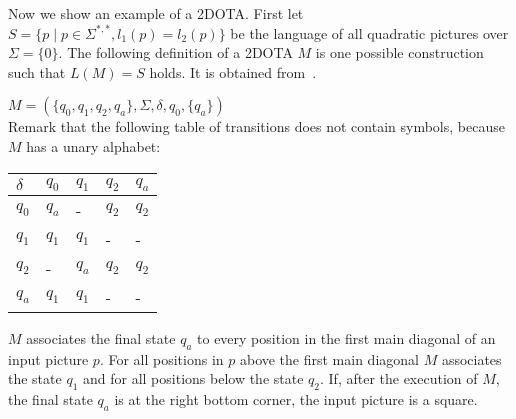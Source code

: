 Now we show an example of a 2DOTA. First let $S = \{p \mid p\in\Sigma^{*,*}, l_1(p) = l_2(p)\}$ be
the language of all quadratic pictures over $\Sigma = \lbrace 0 \rbrace$. The following definition
of a 2DOTA $M$ is one possible construction such that $L(M) = S$ holds. It is obtained
from~\cite{giammarresi1997twodimensional}.
\begin{example}
$M = (\{q_0, q_1, q_2, q_a\}, \Sigma, \delta, q_0, \{q_a\})$ \\
Remark that the following table of transitions does not contain symbols, because $M$ has a unary
alphabet:
\begin{center}
\begin{tabular}{C{0.74cm}|C{0.74cm}|C{0.8cm}|C{0.8cm}|C{0.8cm}}
$\delta$ & $q_0$ & $q_1$ & $q_2$ & $q_a$ \tabularnewline
\hline
$q_0$    & $q_a$ & -     & $q_2$ & $q_2$ \tabularnewline
\hline
$q_1$    & $q_1$ & $q_1$ & -     & -     \tabularnewline
\hline
$q_2$    & -     & $q_a$ & $q_2$ & $q_2$ \tabularnewline
\hline
$q_a$    & $q_1$ & $q_1$ & -     & -     \tabularnewline
\end{tabular}
\end{center}
\label{example_2dota}
\end{example}
$M$ associates the final state $q_a$ to every position in the first main diagonal of an input
picture $p$. For all positions in $p$ above the first main diagonal $M$ associates the state $q_1$
and for all positions below the state $q_2$. If, after the execution of $M$, the final state $q_a$
is at the right bottom corner, the input picture is a square. 

